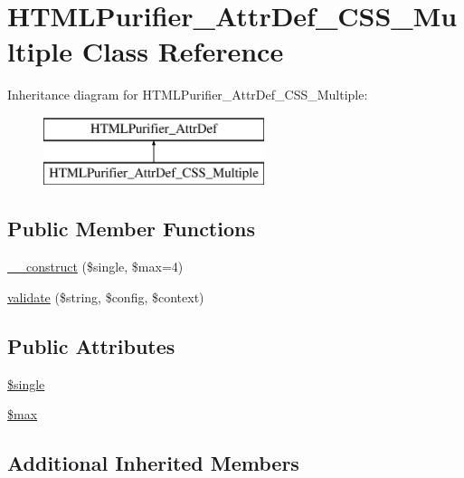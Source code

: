 \hypertarget{classHTMLPurifier__AttrDef__CSS__Multiple}{\section{H\+T\+M\+L\+Purifier\+\_\+\+Attr\+Def\+\_\+\+C\+S\+S\+\_\+\+Multiple Class Reference}
\label{classHTMLPurifier__AttrDef__CSS__Multiple}
}
Inheritance diagram for H\+T\+M\+L\+Purifier\+\_\+\+Attr\+Def\+\_\+\+C\+S\+S\+\_\+\+Multiple\+:\begin{figure}[H]
\begin{center}
\leavevmode
\includegraphics[height=2.000000cm]{classHTMLPurifier__AttrDef__CSS__Multiple}
\end{center}
\end{figure}
\subsection*{Public Member Functions}
\begin{DoxyCompactItemize}
\item 
\hyperlink{classHTMLPurifier__AttrDef__CSS__Multiple_a2f68d9177a3f933a5190d0d3d8b306da}{\+\_\+\+\_\+construct} (\$single, \$max=4)
\item 
\hyperlink{classHTMLPurifier__AttrDef__CSS__Multiple_ac1ce16e5b3fe062e3254a82b6b05fec0}{validate} (\$string, \$config, \$context)
\end{DoxyCompactItemize}
\subsection*{Public Attributes}
\begin{DoxyCompactItemize}
\item 
\hyperlink{classHTMLPurifier__AttrDef__CSS__Multiple_a52fb60d24dfe202beeaa7f7c6bad97f1}{\$single}
\item 
\hyperlink{classHTMLPurifier__AttrDef__CSS__Multiple_a65da5b3ca816d32bb1698add3e0a3576}{\$max}
\end{DoxyCompactItemize}
\subsection*{Additional Inherited Members}


